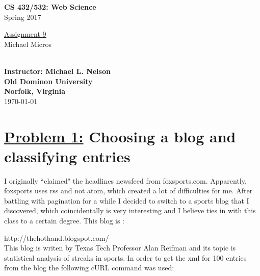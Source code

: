 \documentclass{article}
\begin{document}

\begin{titlepage}

\vspace*{45 pt}
\begin{center}
\Huge{\bf CS 432/532:  Web Science}\\
\huge{Spring 2017\\}

\vspace{60 pt}
\Huge\underline {Assignment 9}\\

\vspace{10 pt}
\Huge{Michael Micros}\\\

{\Large \bf {Instructor: Michael L. Nelson}}\\

\vspace{230 pt}
{\huge \bf {Old Dominon University}}\\
{\huge \bf {Norfolk, Virginia}}\\

\vspace{10 pt}
\today

\end{center}
\end{titlepage}





\section*{{\underline{\huge {Problem 1:}} Choosing a blog and classifying entries}}

I originally ``claimed" the headlines newsfeed from foxsports.com. Apparently, foxsports uses rss and not atom, which created a lot of difficulties for me. After battling with pagination for a while I decided to switch to a sports blog that I discovered, which coincidentally is very interesting and I believe ties in with this class to a certain degree. This blog is :

 http://thehothand.blogspot.com/ \\
This blog is writen by Texas Tech Professor Alan Reifman and its topic is statistical analysis of streaks in sports.
In order to get the xml for 100 entries from the blog the following cURL command was used:
\end{document}
